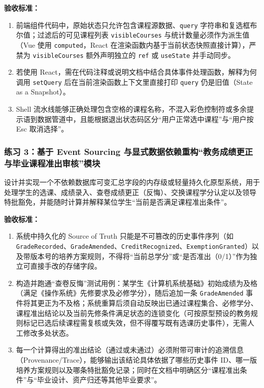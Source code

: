 \documentclass[UTF8,a4paper,11pt,fontset=fandol]{ctexart}
\begin{document}
\par{}\textbf{验收标准：}

\begin{enumerate}
\item 前端组件代码中，原始状态只允许包含课程源数据、\texttt{query} 字符串和复选框布尔值；过滤后的可见课程列表 \texttt{visibleCourses} 与统计数量必须作为派生值（Vue 使用 \texttt{computed}，React 在渲染函数内基于当前状态快照直接计算），严禁为 \texttt{visibleCourses} 额外声明独立的 \texttt{ref} 或 \texttt{useState} 并手动同步。


\item 若使用 React，需在代码注释或说明文档中结合具体事件处理函数，解释为何调用 \texttt{setQuery} 后在当前渲染函数上下文里直接打印 \texttt{query} 仍是旧值（State as a Snapshot）。


\item Shell 流水线能够正确处理包含空格的课程名称，不混入彩色控制符或多余提示语到数据管道中，且能根据退出状态码区分“用户正常选中课程”与“用户按 Esc 取消选择”。
\end{enumerate}

\subsubsection*{练习 3：基于 Event Sourcing 与显式数据依赖重构“教务成绩更正与毕业课程准出审核”模块}

设计并实现一个不依赖数据库可变汇总字段的内存级或轻量持久化原型系统，用于处理学生的选课、成绩录入、查卷成绩更正（反悔）、交换课程学分认定以及领导特批豁免，并能随时计算并解释某位学生“当前是否满足课程准出条件”。

\par{}\textbf{验收标准：}

\begin{enumerate}
\item 系统中持久化的 Source of Truth 只能是不可篡改的历史事件序列（如 \texttt{GradeRecorded}、\texttt{GradeAmended}、\texttt{CreditRecognized}、\texttt{ExemptionGranted}）以及带版本号的培养方案规则，不得将“当前总学分”或“是否准出（0/1）”作为独立可直接手改的存储字段。


\item 构造并跑通“查卷反悔”测试用例：某学生《计算机系统基础》初始成绩为及格（满足《操作系统》先修要求及必修学分），随后追加一条 \texttt{GradeAmended} 事件将其更正为不及格；系统重算后须自动反映出已通过课程集合、必修学分、课程准出结论以及当前先修条件满足状态的连锁变化（可按原型预设的教务规则标记已选后续课程需复核或失效，但不得覆写既有选课历史事件），无需人工修改多处状态。


\item 每一个计算得出的准出结论（通过或未通过）必须附带可审计的追溯信息（Provenance/Trace），能够输出该结论具体依据了哪些历史事件 ID、哪一版培养方案规则以及哪条特批豁免记录；同时在文档中明确区分“课程准出条件”与“毕业设计、资产归还等其他毕业要求”。
\end{enumerate}
\end{document}

